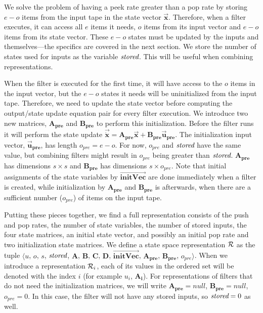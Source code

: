 We solve the problem of having a peek rate greater than a pop
rate by storing $e-o$ items from the input tape in the state
vector $\vec{\mathbf{x}}$. Therefore, when a filter executes, it
can access all $e$ items it needs, $o$ items from its input vector
and $e-o$ items from its state vector. These $e-o$ states must be
updated by the inputs and themselves---the specifics are covered
in the next section. We store the number of states used for inputs
as the variable $\mbox{\it stored}$. This will be useful when combining
representations.

When the filter is executed for the first time, it will have access to
the $o$ items in the input vector, but the $e-o$ states it needs will
be uninitialized from the input tape.  Therefore, we need to update
the state vector before computing the output/state update equation
pair for every filter execution. We introduce two new matrices,
$\mathbf{A_{pre}}$ and $\mathbf{B_{pre}}$ to perform this
initialization. Before the filter runs it will perform the state
update $\vec{\dot{\mathbf{x}}} =
\mathbf{A_{pre}}\vec{\mathbf{x}} +
\mathbf{B_{pre}}\vec{\mathbf{u}}_\mathbf{pre}$. The initialization input
vector, $\vec{\mathbf{u}}_\mathbf{pre}$, has length $o_{pre} =
e-o$. For now, $o_{pre}$ and $\mbox{\it stored}$ have the same value, but
combining filters might result in $o_{pre}$ being greater than
$\mbox{\it stored}$.  $\mathbf{A_{pre}}$ has dimensions $s \times s$ and
$\mathbf{B_{pre}}$ has dimensions $s
\times o_{pre}$. Note that initial assignments of the state
variables by $\overrightarrow{\mathbf{initVec}}$ are done
immediately when a filter is created, while initialization by
$\mathbf{A_{pre}}$ and $\mathbf{B_{pre}}$ is afterwards, when
there are a sufficient number ($o_{pre}$) of items on the input
tape.

Putting these pieces together, we find a full representation consists
of the push and pop rates, the number of state variables, the number
of stored inputs, the four state matrices, an initial state vector,
and possibly an initial pop rate and two initialization state
matrices. We define a state space representation $\cal{R}$ as the
tuple $\langle$$u$, $o$, $s$, $\mbox{\it stored}$, $\mathbf{A}$, $\mathbf{B}$,
$\mathbf{C}$, $\mathbf{D}$, $\overrightarrow{\mathbf{initVec}}$,
$\mathbf{A_{pre}}$, $\mathbf{B_{pre}}$, $o_{pre}$$\rangle$. When we
introduce a representation ${\cal R}_i$, each of its values in the
ordered set will be denoted with the index $i$ (for example $u_i$,
$\mathbf{A_i}$). For representations of filters that do not need the
initialization matrices, we will write $\mathbf{A_{pre}} = null$,
$\mathbf{B_{pre}} = null$, $o_{pre} = 0$. In this case, the filter
will not have any stored inputs, so $\mbox{\it stored} = 0$ as well.

